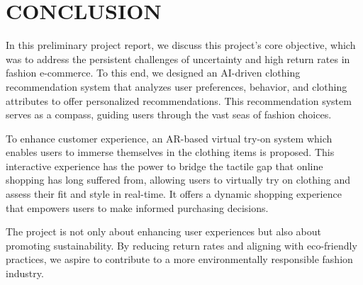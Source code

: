 \chapter[Conclusion]{CONCLUSION}

In this preliminary project report, we discuss this project's core objective, which was to address the persistent challenges of uncertainty and high return rates in fashion e-commerce. To this end, we designed an AI-driven clothing recommendation system that analyzes user preferences, behavior, and clothing attributes to offer personalized recommendations. This recommendation system serves as a compass, guiding users through the vast seas of fashion choices.

To enhance customer experience, an AR-based virtual try-on system which enables users to immerse themselves in the clothing items is proposed. This interactive experience has the power to bridge the tactile gap that online shopping has long suffered from, allowing users to virtually try on clothing and assess their fit and style in real-time. It offers a dynamic shopping experience that empowers users to make informed purchasing decisions.

The project is not only about enhancing user experiences but also about promoting sustainability. By reducing return rates and aligning with eco-friendly practices, we aspire to contribute to a more environmentally responsible fashion industry.